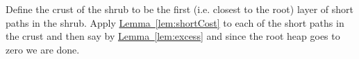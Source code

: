 \documentclass[11pt]{article}
\newtheorem{lemma}[theorem]{Lemma}
\theoremstyle{definition}
\newcommand{\Lem}[1]{\hyperref[lem:#1]{Lemma~\ref*{lem:#1}}} %
\newcommand{\remove}[1]{}
\newcommand{\pth}[2][\!]{#1\left({#2}\right)}
\begin{document}
\remove{
% 
% 
% 
% 
}


Define the crust of the shrub to be the first (i.e. closest to the root) layer of short paths in the shrub.  Apply \Lem{shortCost} to each of the short paths in the crust and then 
say by \Lem{excess} and since the root heap goes to zero we are done.
\end{document}
